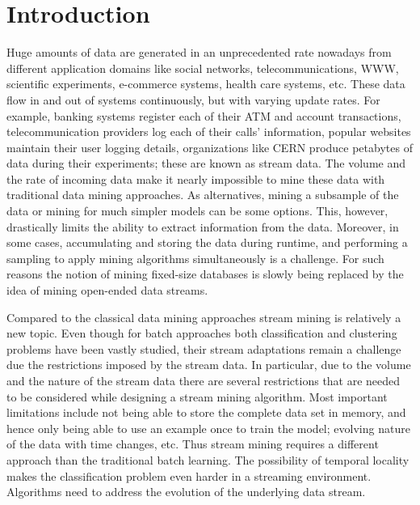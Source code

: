 \chapter{Introduction}
\label{chp:intro}
Huge amounts of data are generated in an unprecedented rate nowadays from different application domains like social networks, telecommunications, WWW, scientific experiments, e-commerce systems, health care systems, etc. These data flow in and out of systems continuously, but with varying update rates. For example, banking systems register each of their ATM and account transactions, telecommunication providers log each of their calls' information, popular websites maintain their user logging details, organizations like CERN produce petabytes of data during their experiments; these are known as stream data. The volume and the rate of incoming data make it nearly impossible to mine these data with traditional data mining approaches. As alternatives, mining a subsample of the data or mining for much simpler models can be some options. This, however, drastically limits the ability to extract information from the data. Moreover, in some cases, accumulating and storing the data during runtime, and performing a sampling to apply mining algorithms simultaneously is a challenge. For such reasons the notion of mining fixed-size databases is slowly being replaced by the idea of mining open-ended data streams.

Compared to the classical data mining approaches stream mining is relatively a new topic. Even though for batch approaches both classification and clustering problems have been vastly studied, their stream adaptations remain a challenge due the restrictions imposed by the stream data. In particular, due to the volume and the nature of the stream data there are several restrictions that are needed to be considered while designing a stream mining algorithm. Most important limitations include not being able to store the complete data set in memory, and hence only being able to use an example once to train the model; evolving nature of the data with time changes, etc. Thus stream mining requires a different approach than the traditional batch learning. The possibility of temporal locality makes the classification problem even harder in a streaming environment. Algorithms need to address the evolution of the underlying data stream.

